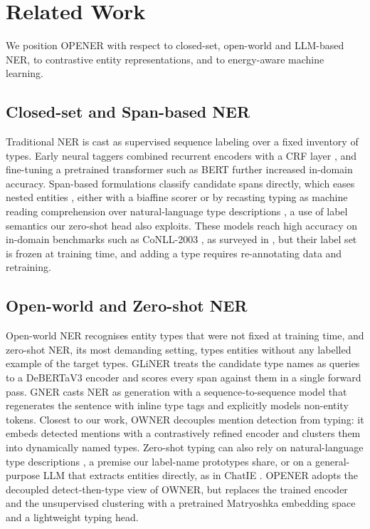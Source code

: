 \documentclass[pdflatex,sn-basic,Numbered]{sn-jnl}
\begin{document}
\section{Related Work}
\label{sec:related}

{
We position OPENER with respect to closed-set, open-world and LLM-based NER, to contrastive entity representations, and to energy-aware machine learning.
\par}

\subsection{Closed-set and Span-based NER}
\label{sec:related:closed}
{
Traditional NER is cast as supervised sequence labeling over a fixed inventory of types.
Early neural taggers combined recurrent encoders with a CRF layer \cite{lample2016ner}, and fine-tuning a pretrained transformer such as BERT \cite{devlin2019bert} further increased in-domain accuracy.
Span-based formulations classify candidate spans directly, which eases nested entities \cite{nguyen2023span}, either with a biaffine scorer \cite{yu2020biaffine} or by recasting typing as machine reading comprehension over natural-language type descriptions \cite{li2020mrc}, a use of label semantics our zero-shot head also exploits.
These models reach high accuracy on in-domain benchmarks such as CoNLL-2003 \cite{tjongkimsang2003conll}, as surveyed in \cite{li2022survey}, but their label set is frozen at training time, and adding a type requires re-annotating data and retraining.
\par}

\subsection{Open-world and Zero-shot NER}
\label{sec:related:openworld}
{
Open-world NER recognises entity types that were not fixed at training time, and zero-shot NER, its most demanding setting, types entities without any labelled example of the target types.
GLiNER \cite{zaratiana2024gliner} treats the candidate type names as queries to a DeBERTaV3 encoder \cite{he2023debertav3} and scores every span against them in a single forward pass.
GNER \cite{ding2024gner} casts NER as generation with a sequence-to-sequence model \cite{raffel2020t5} that regenerates the sentence with inline type tags and explicitly models non-entity tokens.
Closest to our work, OWNER \cite{genest2025owner} decouples mention detection from typing: it embeds detected mentions with a contrastively refined encoder and clusters them into dynamically named types.
Zero-shot typing can also rely on natural-language type descriptions \cite{aly2021zeroshot}, a premise our label-name prototypes share, or on a general-purpose LLM that extracts entities directly, as in ChatIE \cite{wei2024chatie}.
OPENER adopts the decoupled detect-then-type view of OWNER, but replaces the trained encoder and the unsupervised clustering with a pretrained Matryoshka embedding space and a lightweight typing head.
\par}
\end{document}
